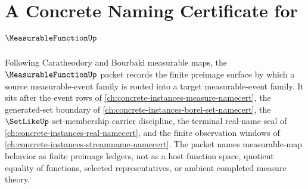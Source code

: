 \chapter{A Concrete Naming Certificate for $\MeasurableFunctionUp$}
\label{ch:concrete-instances-measurable-function-namecert}

Following Caratheodory and Bourbaki measurable maps, the $\MeasurableFunctionUp$ packet records the finite preimage surface by which a source measurable-event family is routed into a target measurable-event family. It sits after the event rows of \autoref{ch:concrete-instances-measure-namecert}, the generated-set boundary of \autoref{ch:concrete-instances-borel-set-namecert}, the $\SetLikeUp$ set-membership carrier discipline, the terminal real-name seal of \autoref{ch:concrete-instances-real-namecert}, and the finite observation windows of \autoref{ch:concrete-instances-streamname-namecert}. The packet names measurable-map behavior as finite preimage ledgers, not as a host function space, quotient equality of functions, selected representatives, or ambient completed measure theory.


